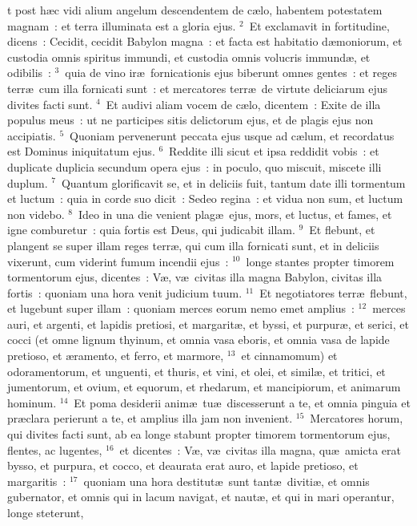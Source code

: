 \bchapter
{}t post h\ae c vidi alium angelum descendentem de c\ae lo, habentem potestatem magnam~: et terra illuminata est a gloria ejus.
${}^{2}$~Et exclamavit in fortitudine, dicens~: Cecidit, cecidit Babylon magna~: et facta est habitatio d\ae moniorum, et custodia omnis spiritus immundi, et custodia omnis volucris immund\ae , et odibilis~:
${}^{3}$~quia de vino ir\ae\ fornicationis ejus biberunt omnes gentes~: et reges terr\ae\ cum illa fornicati sunt~: et mercatores terr\ae\ de virtute deliciarum ejus divites facti sunt.
${}^{4}$~Et audivi aliam vocem de c\ae lo, dicentem~: Exite de illa populus meus~: ut ne participes sitis delictorum ejus, et de plagis ejus non accipiatis.
${}^{5}$~Quoniam pervenerunt peccata ejus usque ad c\ae lum, et recordatus est Dominus iniquitatum ejus.
${}^{6}$~Reddite illi sicut et ipsa reddidit vobis~: et duplicate duplicia secundum opera ejus~: in poculo, quo miscuit, miscete illi duplum.
${}^{7}$~Quantum glorificavit se, et in deliciis fuit, tantum date illi tormentum et luctum~: quia in corde suo dicit~: Sedeo regina~: et vidua non sum, et luctum non videbo.
${}^{8}$~Ideo in una die venient plag\ae\ ejus, mors, et luctus, et fames, et igne comburetur~: quia fortis est Deus, qui judicabit illam.
${}^{9}$~Et flebunt, et plangent se super illam reges terr\ae , qui cum illa fornicati sunt, et in deliciis vixerunt, cum viderint fumum incendii ejus~:
${}^{10}$~longe stantes propter timorem tormentorum ejus, dicentes~: V\ae , v\ae\ civitas illa magna Babylon, civitas illa fortis~: quoniam una hora venit judicium tuum.
${}^{11}$~Et negotiatores terr\ae\ flebunt, et lugebunt super illam~: quoniam merces eorum nemo emet amplius~:
${}^{12}$~merces auri, et argenti, et lapidis pretiosi, et margarit\ae , et byssi, et purpur\ae , et serici, et cocci (et omne lignum thyinum, et omnia vasa eboris, et omnia vasa de lapide pretioso, et \ae ramento, et ferro, et marmore,
${}^{13}$~et cinnamomum) et odoramentorum, et unguenti, et thuris, et vini, et olei, et simil\ae , et tritici, et jumentorum, et ovium, et equorum, et rhedarum, et mancipiorum, et animarum hominum.
${}^{14}$~Et poma desiderii anim\ae\ tu\ae\ discesserunt a te, et omnia pinguia et pr\ae clara perierunt a te, et amplius illa jam non invenient.
${}^{15}$~Mercatores horum, qui divites facti sunt, ab ea longe stabunt propter timorem tormentorum ejus, flentes, ac lugentes,
${}^{16}$~et dicentes~: V\ae , v\ae\ civitas illa magna, qu\ae\ amicta erat bysso, et purpura, et cocco, et deaurata erat auro, et lapide pretioso, et margaritis~:
${}^{17}$~quoniam una hora destitut\ae\ sunt tant\ae\ diviti\ae , et omnis gubernator, et omnis qui in lacum navigat, et naut\ae , et qui in mari operantur, longe steterunt,
